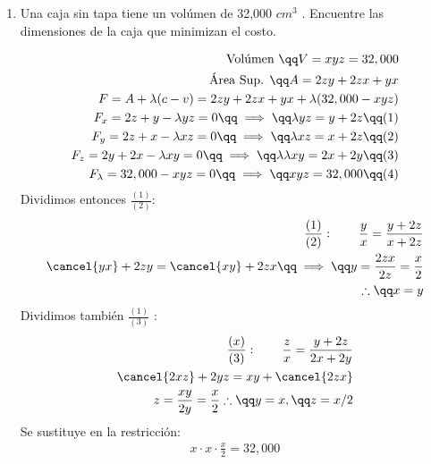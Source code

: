\begin{enumerate}
    \item Una caja sin tapa tiene un volúmen de 32,000 $\displaystyle cm^3$ . Encuentre las dimensiones de la caja que minimizan el costo.
    \begin{center}
       \begin{align*}
           \text{ Volúmen } \qq V=xyz = 32,000 \\ 
            \text{ Área Sup. } \qq 
            A=2zy+2zx+yx \\ 
            F = A+\lambda (c-v) = 2zy+2zx+yx+\lambda (32,000-xyz) \\ 
            F_x = 2z+y-\lambda yz = 0 \qq \implies \qq \lambda yz = y+2z \qq (1) \\ 
            F_y = 2z+x-\lambda xz= 0 \qq \implies \qq \lambda xz = x+2z \qq (2) \\ 
            F_z = 2y+2x-\lambda xy = 0 \qq \implies \qq \lambda \lambda xy = 2x+2y \qq (3)\\ 
            F_\lambda = 32,000-xyz = 0 \qq \implies \qq xyz=32,000 \qq (4) \\ 
       \end{align*}
       Dividimos entonces $\displaystyle \frac{(1)}{(2)} $:
        \begin{align*}
            \frac{(1)}{(2)}: \qquad  \frac{y}{x} = \frac{y+2z}{x+2z}  \\ 
            \cancel{yx}+2zy=\cancel{xy}+2zx \qq \implies \qq y = \frac{2zx}{2z} = \frac{x}{2} \\ 
            \therefore \qq x = y \\ 
        \end{align*}
        Dividimos también $\displaystyle \frac{(1)}{(3)} $ :
        \begin{align*}
            \frac{(x)}{(3)}: \qquad \frac{z}{x} = \frac{y+2z}{2x+2y} \\ 
            \cancel{2xz} + 2yz=xy+\cancel{2zx} \\ 
            z = \frac{xy}{2y} = \frac{x}{2} 
            \therefore \qq  y = x, \qq z = x/2 \\ 
        \end{align*}
        Se sustituye en la restricción:
        \begin{align*}
            x\cdot x\cdot \frac{x}{2} = 32,000 \\ 

\end{align*}
\end{center}
\end{enumerate}
